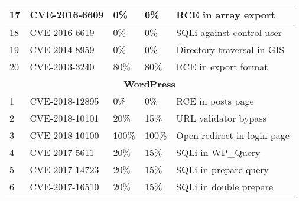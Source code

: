 \begin{table*}[]
\begin{adjustbox}{max width=0.65\textwidth}
\begin{tabular}{|lllll|}
    \multicolumn{1}{|l|}{17}          & \multicolumn{1}{l|}{CVE-2016-6609}    & \multicolumn{1}{l|}{0\%}                  & \multicolumn{1}{l|}{0\%}               & RCE in array export             \\ \hline
    \multicolumn{1}{|l|}{18}          & \multicolumn{1}{l|}{CVE-2016-6619}    & \multicolumn{1}{l|}{0\%}                  & \multicolumn{1}{l|}{0\%}               & SQLi against control user       \\ \hline
    \multicolumn{1}{|l|}{19}          & \multicolumn{1}{l|}{CVE-2014-8959}    & \multicolumn{1}{l|}{0\%}                  & \multicolumn{1}{l|}{0\%}               & Directory traversal in GIS      \\ \hline
    \multicolumn{1}{|l|}{20}          & \multicolumn{1}{l|}{CVE-2013-3240}    & \multicolumn{1}{l|}{80\%}                 & \multicolumn{1}{l|}{80\%}              & RCE in export format            \\ \hline
    \multicolumn{5}{|c|}{\textbf{WordPress}}                                                                                                                                                                 \\ \hline
    \multicolumn{1}{|l|}{1}           & \multicolumn{1}{l|}{CVE-2018-12895}   & \multicolumn{1}{l|}{0\%}                  & \multicolumn{1}{l|}{0\%}               & RCE in posts page                       \\ \hline
    \multicolumn{1}{|l|}{2}           & \multicolumn{1}{l|}{CVE-2018-10101}   & \multicolumn{1}{l|}{20\%}                 & \multicolumn{1}{l|}{15\%}              & URL validator bypass                    \\ \hline
    \multicolumn{1}{|l|}{3}           & \multicolumn{1}{l|}{CVE-2018-10100}   & \multicolumn{1}{l|}{100\%}                & \multicolumn{1}{l|}{100\%}             & Open redirect in login page             \\ \hline
    \multicolumn{1}{|l|}{4}           & \multicolumn{1}{l|}{CVE-2017-5611}    & \multicolumn{1}{l|}{20\%}                 & \multicolumn{1}{l|}{15\%}              & SQLi in WP\_Query                       \\ \hline
    \multicolumn{1}{|l|}{5}           & \multicolumn{1}{l|}{CVE-2017-14723}   & \multicolumn{1}{l|}{20\%}                 & \multicolumn{1}{l|}{15\%}              & SQLi in prepare query                   \\ \hline
    \multicolumn{1}{|l|}{6}           & \multicolumn{1}{l|}{CVE-2017-16510}   & \multicolumn{1}{l|}{20\%}                 & \multicolumn{1}{l|}{15\%}              & SQLi in double prepare                  \\ \hline

\end{tabular}
\end{adjustbox}
\end{table*}
